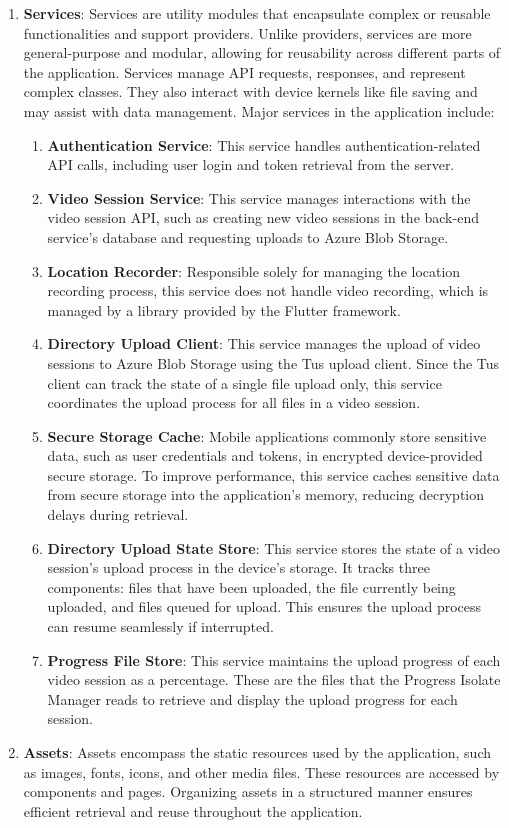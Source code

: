 \begin{enumerate}
    \item \textbf{Services}: Services are utility modules that encapsulate complex or reusable functionalities and support providers. Unlike providers, services are more general-purpose and modular, allowing for reusability across different parts of the application. Services manage API requests, responses, and represent complex classes. They also interact with device kernels like file saving and may assist with data management. Major services in the application include:
    \begin{enumerate}  
        \item \textbf{Authentication Service}: This service handles authentication-related API calls, including user login and token retrieval from the server.  
        \item \textbf{Video Session Service}: This service manages interactions with the video session API, such as creating new video sessions in the back-end service's database and requesting uploads to Azure Blob Storage.  
        \item \textbf{Location Recorder}: Responsible solely for managing the location recording process, this service does not handle video recording, which is managed by a library provided by the Flutter framework.  
        \item \textbf{Directory Upload Client}: This service manages the upload of video sessions to Azure Blob Storage using the Tus upload client. Since the Tus client can track the state of a single file upload only, this service coordinates the upload process for all files in a video session.  
        \item \textbf{Secure Storage Cache}: Mobile applications commonly store sensitive data, such as user credentials and tokens, in encrypted device-provided secure storage. To improve performance, this service caches sensitive data from secure storage into the application's memory, reducing decryption delays during retrieval.  
        \item \textbf{Directory Upload State Store}: This service stores the state of a video session's upload process in the device's storage. It tracks three components: files that have been uploaded, the file currently being uploaded, and files queued for upload. This ensures the upload process can resume seamlessly if interrupted.  
        \item \textbf{Progress File Store}: This service maintains the upload progress of each video session as a percentage. These are the files that the Progress Isolate Manager reads to retrieve and display the upload progress for each session.
    \end{enumerate}  
    
    \item \textbf{Assets}: Assets encompass the static resources used by the application, such as images, fonts, icons, and other media files. These resources are accessed by components and pages. Organizing assets in a structured manner ensures efficient retrieval and reuse throughout the application.
\end{enumerate}


